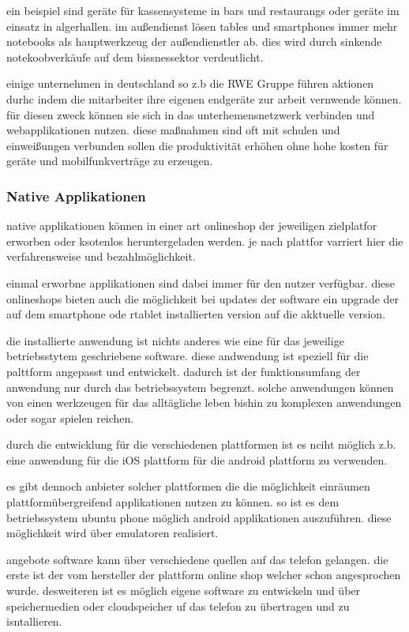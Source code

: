 ein beispiel sind geräte für kassensysteme in bars und restaurangs oder geräte im einsatz in algerhallen. im außendienst lösen tables und smartphones immer mehr notebooks als hauptwerkzeug der außendienstler ab. dies wird durch sinkende notekoobverkäufe auf dem bissnessektor verdeutlicht.

einige unternehmen in deutschland so z.b die RWE Gruppe führen aktionen durhc indem die mitarbeiter ihre eigenen endgeräte zur arbeit vernwende können. für diesen zweck können sie sich in das unterhemensnetzwerk verbinden und webapplikationen nutzen. diese maßnahmen sind oft mit schulen und einweißungen verbunden sollen die produktivität erhöhen ohne hohe kosten für geräte und mobilfunkverträge zu erzeugen.

\subsubsection{Native Applikationen}

native applikationen können in einer art onlineshop der jeweiligen zielplatfor erworben oder ksotenlos heruntergeladen werden. je nach plattfor varriert hier die verfahrensweise und bezahlmöglichkeit.

einmal erworbne applikationen sind dabei immer für den nutzer verfügbar. diese onlineshops bieten auch die möglichkeit bei updates der software ein upgrade der auf dem smartphone ode rtablet installierten version auf die akktuelle version.

die installierte anwendung ist nichts anderes wie eine für das jeweilige betriebsstytem geschriebene software. diese andwendung ist speziell für die palttform angepasst und entwickelt. dadurch ist der funktionsumfang der anwendung nur durch das betriebssystem begrenzt. solche anwendungen können von einen werkzeugen für das alltägliche leben bishin zu komplexen anwendungen oder sogar spielen reichen.

durch die entwicklung für die verschiedenen plattformen ist es nciht möglich z.b. eine anwendung für die iOS plattform für die android plattform zu verwenden.

es gibt dennoch anbieter solcher plattformen die die möglichkeit einräumen plattformübergreifend applikationen nutzen zu können. so ist es dem betriebssystem ubuntu phone möglich android applikationen auszuführen. diese möglichkeit wird über emulatoren realisiert. 

angebote software kann über verschiedene quellen auf das telefon gelangen. die erste ist der vom hersteller der plattform online shop welcher schon angesprochen wurde. desweiteren ist es möglich eigene software zu entwickeln und über speichermedien oder cloudspeicher uf das telefon zu übertragen und zu isntallieren.

